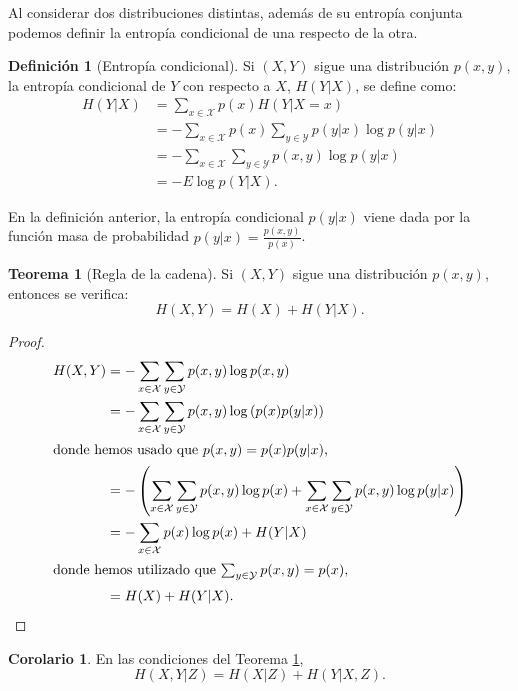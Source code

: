 \documentclass[10pt,a4paper]{article} %
\theoremstyle{definition}
\newtheorem{definition}{Definición}[section]
\newtheorem{theorem}{Teorema}[section]
\newtheorem{corollary}{Corolario}[theorem]
\begin{document}
Al considerar dos distribuciones distintas, además de su entropía conjunta podemos definir la entropía condicional de una respecto de la otra.

\begin{definition}[Entropía condicional]
  Si $(X,Y)$ sigue una distribución $p(x,y)$, la entropía condicional de $Y$ con respecto a $X$, $H(Y|X)$, se define como:
  \begin{align*}
    H(Y|X) &= \sum_{x \in \mathcal{X}} p(x) H(Y | X = x)\\
    &= - \sum_{x \in \mathcal{X}} p(x) \sum_{y \in \mathcal{Y}} p(y | x) \log p(y | x)\\
    &=  - \sum_{x \in \mathcal{X}} \sum_{y \in \mathcal{Y}} p(x,y) \log p(y | x)\\
    &=- E \log p(Y|X).
  \end{align*}
\end{definition}

En la definición anterior, la entropía condicional $p(y|x)$ viene dada por la función masa de probabilidad $p(y|x) = \frac{p(x,y)}{p(x)}$.

\begin{theorem}[Regla de la cadena]\label{t:regla_cadena}
  Si $(X,Y)$ sigue una distribución $p(x,y)$, entonces se verifica:\[
H(X,Y) = H(X) + H(Y|X).
  \]
\end{theorem}

\begin{proof}
  \begin{align*}
    H(X,Y) &= - \sum_{x \in \mathcal{X}} \sum_{y \in \mathcal{Y}} p(x,y) \log p(x,y)\\
    &= - \sum_{x \in \mathcal{X}} \sum_{y \in \mathcal{Y}} p(x,y) \log \left( p(x)p(y|x) \right )\\
    \intertext{donde hemos usado que $p(x,y) = p(x)p(y|x)$,}
    &= - \left(\sum_{x \in \mathcal{X}} \sum_{y \in \mathcal{Y}} p(x,y) \log p(x) + \sum_{x \in \mathcal{X}} \sum_{y \in \mathcal{Y}} p(x,y) \log p(y|x) \right )\\
    &= - \sum_{x \in \mathcal{X}} p(x) \log p(x) + H(Y|X)\\
    \intertext{donde hemos utilizado que $\sum_{y\in \mathcal{Y}}p(x,y) = p(x)$,}
    &= H(X) + H(Y|X).
  \end{align*}
\end{proof}

\begin{corollary} En las condiciones del Teorema \ref{t:regla_cadena},\[
H(X,Y|Z) = H(X|Z) + H(Y|X, Z).
  \]
\end{corollary}
\end{document}
